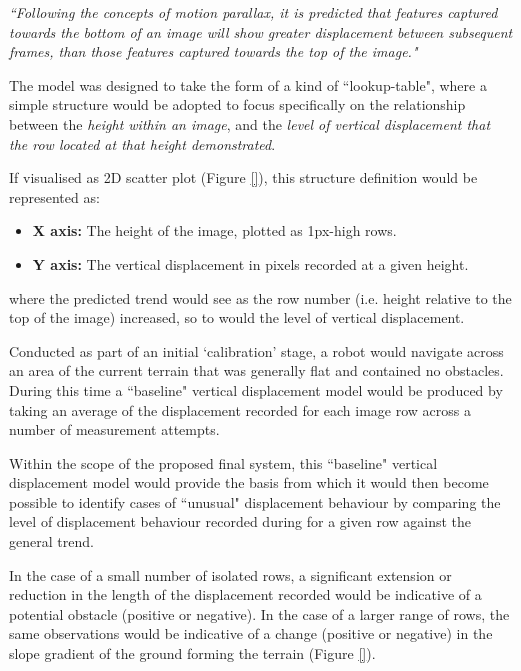 	\indent \textit{``Following the concepts of motion parallax, it is predicted that features captured towards the bottom of an image will show greater displacement between subsequent frames, than those features captured towards the top of the image."}
	
The model was designed to take the form of a kind of ``lookup-table", where a simple structure would be adopted to focus specifically on the relationship between the \textit{height within an image}, and the \textit{level of vertical displacement that the row located at that height demonstrated}. 

 If visualised as 2D scatter plot (Figure \ref{}), this structure definition would be represented as:
	
	\begin{itemize}
		\item \textbf{X axis:} The height of the image, plotted as 1px-high rows.
		\item \textbf{Y axis:} The vertical displacement in pixels recorded at a given height.
	\end{itemize}
	
	where the predicted trend would see as the row number (i.e. height relative to the top of the image) increased, so to would the level of vertical displacement.
	
Conducted as part of an initial `calibration' stage, a robot would navigate across an area of the current terrain that was generally flat and contained no obstacles. During this time a ``baseline" vertical displacement model would be produced by taking an average of the displacement recorded for each image row across a number of measurement attempts.
	
Within the scope of the proposed final system, this ``baseline" vertical displacement model would provide the basis from which it would then become possible to identify cases of ``unusual" displacement behaviour by comparing the level of displacement behaviour recorded during for a given row against the general trend. 

In the case of a small number of isolated rows, a significant extension or reduction in the length of the displacement recorded would be indicative of a potential obstacle (positive or negative). In the case of a larger range of rows, the same observations would be indicative of a change (positive or negative) in the slope gradient of the ground forming the terrain (Figure \ref{}).
	
  
